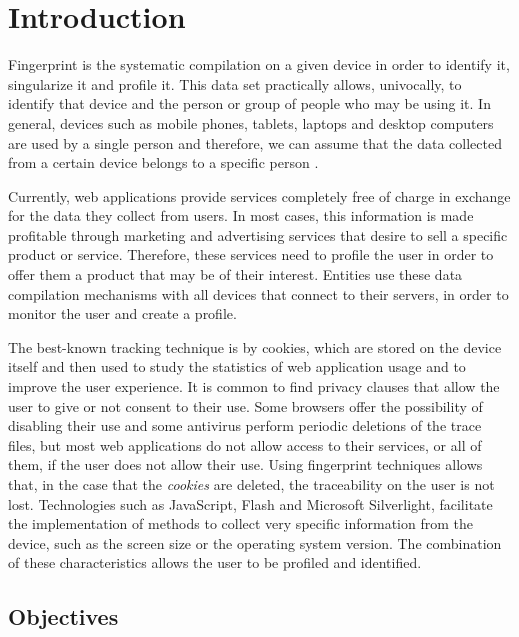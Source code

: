 \chapter{Introduction}

Fingerprint is the systematic compilation on a given device in order to identify it, singularize it and profile it. This data set practically allows, univocally, to identify that device and the person or group of people who may be using it. In general, devices such as mobile phones, tablets, laptops and desktop computers are used by a single person and therefore, we can assume that the data collected from a certain device belongs to a specific person \cite{Huella}. \par

Currently, web applications provide services completely free of charge in exchange for the data they collect from users. In most cases, this information is made profitable through marketing and advertising services that desire to sell a specific product or service. Therefore, these services need to profile the user in order to offer them a product that may be of their interest. Entities use these data compilation mechanisms with all devices that connect to their servers, in order to monitor the user and create a profile. \par

The best-known tracking technique is by cookies, which are stored on the device itself and then used to study the statistics of web application usage and to improve the user experience. It is common to find privacy clauses that allow the user to give or not consent to their use. Some browsers offer the possibility of disabling their use and some antivirus perform periodic deletions of the trace files, but most web applications do not allow access to their services, or all of them, if the user does not allow their use. Using fingerprint techniques allows that, in the case that the \textit{cookies} are deleted, the traceability on the user is not lost. Technologies such as JavaScript, Flash and Microsoft Silverlight, facilitate the implementation of methods to collect very specific information from the device, such as the screen size or the operating system version. The combination of these characteristics allows the user to be profiled and identified. \par

\section{Objectives}


